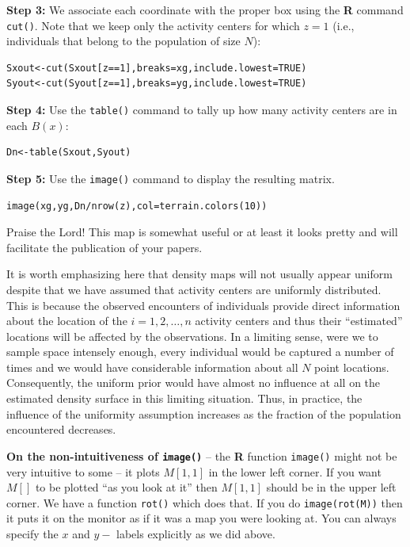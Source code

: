 {\flushleft \bf Step 3:} We associate each coordinate with the proper
box using the {\bf R} command \mbox{\tt cut()}. Note that we keep only
the activity centers for which $z=1$ (i.e., individuals that belong to
the population of size $N$):
\begin{verbatim}
Sxout<-cut(Sxout[z==1],breaks=xg,include.lowest=TRUE)
Syout<-cut(Syout[z==1],breaks=yg,include.lowest=TRUE)
\end{verbatim}

{\flushleft \bf Step 4:} Use the \mbox{\tt table()} command to tally
up how many activity centers are in each $B(x)$:
\begin{verbatim}
Dn<-table(Sxout,Syout)
\end{verbatim}

{\flushleft \bf Step 5:} Use the \mbox{\tt image()} command to display
the resulting matrix.
\begin{verbatim}
image(xg,yg,Dn/nrow(z),col=terrain.colors(10))
\end{verbatim}
Praise the Lord! This map is somewhat useful or at least it looks
pretty and will facilitate the publication of your papers.

It is worth emphasizing here that density maps will not usually appear
uniform despite that we have assumed that activity centers are
uniformly distributed. This is because the observed encounters of
individuals provide direct information about the location of the
$i=1,2,\ldots,n$ activity centers and thus their ``estimated''
locations will be affected by the observations. In a limiting sense,
were we to sample space intensely enough, every individual would be
captured a number of times and we would have considerable information
about all $N$ point locations. Consequently, the uniform prior would
have almost no influence at all on the estimated density surface in
this limiting situation. Thus, in practice, the influence of the
uniformity assumption increases as the fraction of the population
encountered decreases.

{\bf On the non-intuitiveness of \mbox{\tt image()} } -- the {\bf R}
function \mbox{\tt image()} might
not be very intuitive to some -- it plots $M[1,1]$ in the lower left
corner. If you want $M[]$ to be plotted ``as
you look at it'' then $M[1,1]$ should be in the upper left corner.  We
have a function \mbox{\tt rot()} which does that. If you do \mbox{\tt image(rot(M))} then it
puts it on the monitor as if it was a map you were looking at.  You
can always specify the $x$ and $y-$ labels explicitly as we did above.

